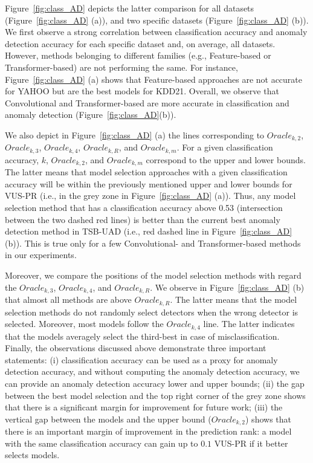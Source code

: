 Figure~\ref{fig:class_AD} depicts the latter comparison for all datasets (Figure~\ref{fig:class_AD} (a)), and two specific datasets (Figure~\ref{fig:class_AD} (b)). We first observe a strong correlation between classification accuracy and anomaly detection accuracy for each specific dataset and, on average, all datasets. However, methods belonging to different families (e.g., Feature-based or Transformer-based) are not performing the same. For instance, Figure~\ref{fig:class_AD} (a) shows that Feature-based approaches are not accurate for YAHOO but are the best models for KDD21. Overall, we observe that Convolutional and Transformer-based are more accurate in classification and anomaly detection (Figure~\ref{fig:class_AD}(b)). 

We also depict in Figure~\ref{fig:class_AD} (a) the lines corresponding to $Oracle_{k,2}$, $Oracle_{k,3}$, $Oracle_{k,4}$, $Oracle_{k,R}$, and $Oracle_{k,m}$. For a given classification accuracy, $k$, $Oracle_{k,2}$, and $Oracle_{k,m}$ correspond to the upper and lower bounds. The latter means that model selection approaches with a given classification accuracy will be within the previously mentioned upper and lower bounds for VUS-PR (i.e., in the grey zone in Figure~\ref{fig:class_AD} (a)). Thus, any model selection method that has a classification accuracy above 0.53 (intersection between the two dashed red lines) is better than the current best anomaly detection method in TSB-UAD (i.e., red dashed line in Figure~\ref{fig:class_AD} (b)). 
This is true only for a few Convolutional- and Transformer-based methods in our experiments.

Moreover, we compare the positions of the model selection methods with regard the $Oracle_{k,3}$, $Oracle_{k,4}$, and $Oracle_{k,R}$. We observe in Figure~\ref{fig:class_AD} (b) that almost all methods are above $Oracle_{k,R}$. The latter means that the model selection methods do not randomly select detectors when the wrong detector is selected. Moreover, most models follow the $Oracle_{k,4}$ line. The latter indicates that the models averagely select the third-best in case of misclassification. Finally, the observations discussed above demonstrate three important statements: (i) classification accuracy can be used as a proxy for anomaly detection accuracy, and without computing the anomaly detection accuracy, we can provide an anomaly detection accuracy lower and upper bounds; (ii) the gap between the best model selection and the top right corner of the grey zone shows that there is a significant margin for improvement for future work; (iii) the vertical gap between the models and the upper bound ($Oracle_{k,2}$) shows that there is an important margin of improvement in the prediction rank: a model with the same classification accuracy can gain up to $0.1$ VUS-PR if it better selects models.


